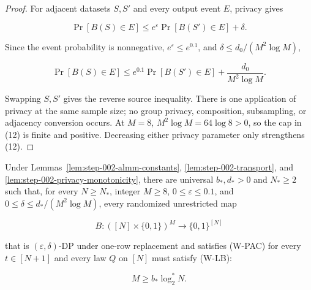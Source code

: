 \begin{proof}
For adjacent datasets \(S,S'\) and every output event \(E\), privacy gives

\[
\Pr[B(S)\in E]
\le e^{\varepsilon}\Pr[B(S')\in E]+\delta.
\]

Since the event probability is nonnegative, \(e^{\varepsilon}\le e^{0.1}\), and
\(\delta\le d_0/(M^2\log M)\),

\[
\Pr[B(S)\in E]
\le e^{0.1}\Pr[B(S')\in E]
   +\frac{d_0}{M^2\log M}.
\tag{12}
\]

Swapping \(S,S'\) gives the reverse source inequality. There is one application of privacy at the same sample size; no group privacy, composition, subsampling, or adjacency conversion occurs. At \(M=8\), \(M^2\log M=64\log8>0\), so the cap in (12) is finite and positive. Decreasing either privacy parameter only strengthens (12). \end{proof}

\begin{proposition}\label{prop:step-002-wrapper}
Under Lemmas~\ref{lem:step-002-almm-constants},
\ref{lem:step-002-transport}, and
\ref{lem:step-002-privacy-monotonicity}, there are universal
\(b_*,d_*>0\) and \(N_*\ge2\) such that, for every \(N\ge N_*\), integer \(M\ge8\),
\(0\le\varepsilon\le0.1\), and
\(0\le\delta\le d_*/(M^2\log M)\), every randomized unrestricted map

\[
B:([N]\times\{0,1\})^M\to\{0,1\}^{[N]}
\]

that is \((\varepsilon,\delta)\)-DP under one-row replacement and satisfies (W-PAC) for every \(t\in[N+1]\) and every law \(Q\) on \([N]\) must satisfy (W-LB):

\[
M\ge b_*\log_2^*N.
\]
\end{proposition}

